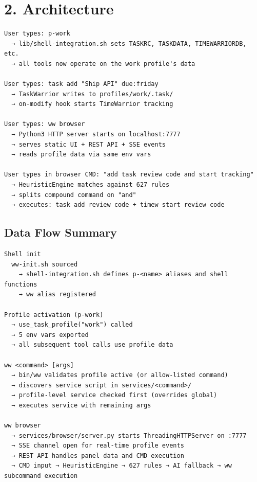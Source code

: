 \documentclass[11pt, a4paper, DIV=14]{scrartcl}
\let\origRule\rule
\renewcommand{\rule}[2]{\par\vspace{2pt}\noindent{\color{BabbBorder}\origRule[0pt]{#1}{#2}}\par\vspace{2pt}}
\begin{document}
\section{2. Architecture}\label{architecture}

\begin{verbatim}
User types: p-work
  → lib/shell-integration.sh sets TASKRC, TASKDATA, TIMEWARRIORDB, etc.
  → all tools now operate on the work profile's data

User types: task add "Ship API" due:friday
  → TaskWarrior writes to profiles/work/.task/
  → on-modify hook starts TimeWarrior tracking

User types: ww browser
  → Python3 HTTP server starts on localhost:7777
  → serves static UI + REST API + SSE events
  → reads profile data via same env vars

User types in browser CMD: "add task review code and start tracking"
  → HeuristicEngine matches against 627 rules
  → splits compound command on "and"
  → executes: task add review code + timew start review code
\end{verbatim}

\subsection{Data Flow Summary}\label{data-flow-summary}

\begin{verbatim}
Shell init
  ww-init.sh sourced
    → shell-integration.sh defines p-<name> aliases and shell functions
    → ww alias registered

Profile activation (p-work)
  → use_task_profile("work") called
  → 5 env vars exported
  → all subsequent tool calls use profile data

ww <command> [args]
  → bin/ww validates profile active (or allow-listed command)
  → discovers service script in services/<command>/
  → profile-level service checked first (overrides global)
  → executes service with remaining args

ww browser
  → services/browser/server.py starts ThreadingHTTPServer on :7777
  → SSE channel open for real-time profile events
  → REST API handles panel data and CMD execution
  → CMD input → HeuristicEngine → 627 rules → AI fallback → ww subcommand execution
\end{verbatim}

\begin{center}\rule{0.5\linewidth}{0.5pt}\end{center}
\end{document}
